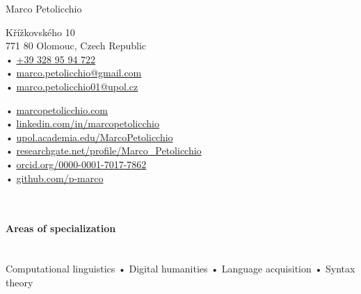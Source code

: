 \documentclass[10pt, a4paper]{article}
\begin{document}
\reversemarginpar
{{\huge Marco Petolicchio}\\[1.2cm]
\parbox{.5\linewidth}{

Křížkovského 10\\
771 80 Olomouc, Czech Republic \\[.4cm]
• \href{tel:+393289594722}{+39 328 95 94 722}\\
• \href{mailto:marco.petolicchio@gmail.com}{marco.petolicchio@gmail.com}\\
• \href{mailto:marco.petolicchio01@upol.cz}{marco.petolicchio01@upol.cz}\\
}
\parbox{.5\linewidth}{
• \href{http://marcopetolicchio.com}{marcopetolicchio.com}\\
• \href{http://www.linkedin.com/in/marcopetolicchio/}{linkedin.com/in/marcopetolicchio}\\
• \href{http://upol.academia.edu/MarcoPetolicchio}{upol.academia.edu/MarcoPetolicchio}\\
• \href{https://www.researchgate.net/profile/Marco_Petolicchio}{researchgate.net/profile/Marco\_Petolicchio}\\
• \href{http://orcid.org/0000-0001-7017-7862}{orcid.org/0000-0001-7017-7862}\\
• \href{http://github.com/p-marco/}{github.com/p-marco}\\
}\\[.4cm]



\paragraph{Areas of specialization} \hfill \\%
Computational linguistics • Digital humanities • Language acquisition • Syntax theory 




}
\end{document}
